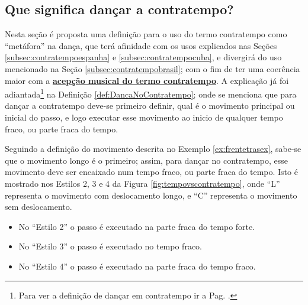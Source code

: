 \subsection{Que significa dançar a contratempo?}
Nesta seção é proposta uma definição para o uso do termo contratempo como ``metáfora'' na dança,
que terá afinidade  com os usos explicados nas 
Seções \ref{subsec:contratempoespanha} e \ref{subsec:contratempocuba},
e divergirá do uso mencionado na Seção \ref{subsec:contratempobrasil};
com o fim de ter uma coerência maior com a \hyperref[sec:contratempo]{\textbf{acepção musical do termo contratempo}}.
A explicação já foi adiantada\footnote{Para 
ver a definição de dançar em contratempo ir a Pag. \pageref{def:DancaNoContratempo}.}
 na Definição \ref{def:DancaNoContratempo};
onde se menciona que para dançar a contratempo deve-se primeiro definir,
 qual é o movimento principal ou inicial do passo,
e logo executar esse movimento ao inicio de qualquer tempo fraco, ou parte fraca do tempo.

\begin{example}
Seguindo a definição do movimento descrita no Exemplo \ref{ex:frentetrasex},
sabe-se que o movimento longo é o primeiro;
assim, para dançar no contratempo, esse movimento deve ser encaixado num tempo fraco,
ou parte fraca do tempo.
Isto é mostrado nos Estilos 2, 3 e 4 da Figura \ref{fig:tempovscontratempo},
onde ``L'' representa o movimento com deslocamento longo,
e ``C'' representa o movimento sem deslocamento.
\begin{itemize} 
\item No ``Estilo 2'' o passo é executado na parte fraca do tempo forte.
\item No ``Estilo 3'' o passo é executado no tempo fraco.
\item No ``Estilo 4'' o passo é executado na parte fraca do tempo fraco.
\end{itemize}
\end{example}
